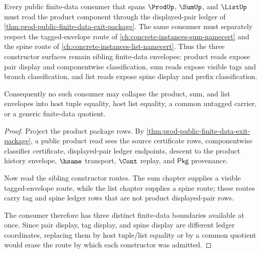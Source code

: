 \begin{theorem}
\label{thm:prod-public-finite-data-exit-sibling-route}
Every public finite-data consumer that spans $\ProdUp$, $\SumUp$, and
$\ListUp$ must read the product component through the displayed-pair ledger of
\autoref{thm:prod-public-finite-data-exit-package}. The same consumer must
separately respect the tagged-envelope route of
\autoref{ch:concrete-instances-sum-namecert} and the spine route of
\autoref{ch:concrete-instances-list-namecert}. Thus the three constructor
surfaces remain sibling finite-data envelopes: product reads expose pair
display and componentwise classification, sum reads expose visible tags and
branch classification, and list reads expose spine display and prefix
classification.

Consequently no such consumer may collapse the product, sum, and list
envelopes into host tuple equality, host list equality, a common untagged
carrier, or a generic finite-data quotient.
\end{theorem}
\begin{proof}
Project the product package rows. By
\autoref{thm:prod-public-finite-data-exit-package}, a public product read sees
the source certificate rows, componentwise classifier certificate,
displayed-pair ledger endpoints, descent to the product history envelope,
$\hsame$ transport, $\Cont$ replay, and $\mathsf{Pkg}$ provenance.

Now read the sibling constructor routes. The sum chapter supplies a visible
tagged-envelope route, while the list chapter supplies a spine route; these
routes carry tag and spine ledger rows that are not product displayed-pair
rows.

The consumer therefore has three distinct finite-data boundaries available at
once. Since pair display, tag display, and spine display are different ledger
coordinates, replacing them by host tuple/list equality or by a common quotient
would erase the route by which each constructor was admitted.
\end{proof}

